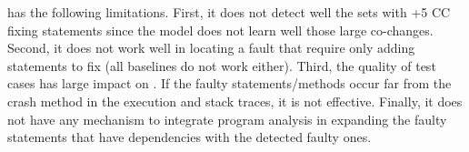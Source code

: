 
\vspace{3pt}
 {\tool} has the following
limitations. First, it does not detect well the sets with +5 CC fixing
statements since the model does not learn well those large
co-changes. Second, it does not work well in locating a fault that
require only adding statements to fix (all baselines do not
work either). Third, the quality of test cases has large impact on
{\tool}. If the faulty statements/methods occur far from the crash
method in the execution and stack traces, it is not effective.
Finally, it does not have any mechanism to integrate program analysis
in expanding the faulty statements that have dependencies with the
detected faulty ones.



